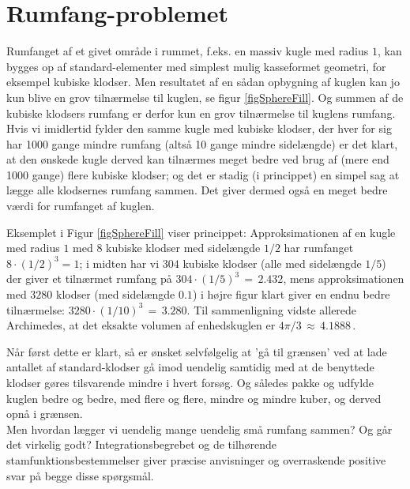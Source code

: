 \section{Rumfang-problemet} \label{secRumfang}
Rumfanget af et givet område i rummet, f.eks. en massiv
kugle med radius $1$,  kan bygges op af
standard-elementer med simplest mulig kasseformet
geometri, for eksempel kubiske klodser. Men resultatet af en sådan opbygning af kuglen kan jo kun
blive en grov tilnærmelse til kuglen, se figur \ref{figSphereFill}. Og summen af de kubiske
klodsers rumfang er derfor kun en grov tilnærmelse til
kuglens rumfang. \\

Hvis vi imidlertid fylder den samme kugle med kubiske
klod\-ser, der hver for sig har 1000 gange
mindre rumfang (altså 10 gange mindre sidelængde) er det klart, at den ønskede
kugle derved kan tilnærmes meget bedre ved brug af (mere end 1000 gange) flere
kubiske klodser; og det
er stadig (i princippet) en simpel sag at lægge
alle klodsernes rumfang sammen. Det giver dermed
også en meget bedre værdi for rumfanget af
kuglen. \\

\begin{aha}
Eksemplet i Figur \ref{figSphereFill} viser princippet:
Approksimationen af en kugle med radius $1$ med $8$ kubiske klodser med sidelængde $1/2$ har rumfanget $8\cdot (1/2)^{3} = 1$; i midten har vi  $304$ kubiske klodser (alle med sidelængde $1/5$) der giver et
tilnærmet rumfang på $304\cdot (1/5)^{3} \, = \, 2.432$, mens approksimationen
med $3280$ klodser (med sidelængde $0.1$) i højre figur klart giver en endnu bedre tilnærmelse:
$3280\cdot (1/10)^{3} \, = \, 3.280$. Til sammenligning vidste allerede Archimedes,
at det eksakte volumen af enhedskuglen er $4\pi/3 \, \approx \, 4.1888\,.$\\
\end{aha}


Når først dette er klart, så er ønsket
selvfølgelig at 'gå til grænsen' ved at lade antallet
af standard-klodser gå imod uendelig samtidig med
at de benyttede klodser gøres tilsvarende mindre i
hvert forsøg. Og således pakke og udfylde kuglen bedre og bedre, med flere og flere, mindre og mindre kuber, og derved opnå  i grænsen. \\

Men
hvordan lægger vi uendelig mange uendelig små
rumfang sammen? Og går det virkelig godt?
Integrationsbegrebet og de tilhørende stamfunktionsbestemmelser giver præcise anvisninger og
overraskende positive svar på begge disse
spørgsmål. \\

